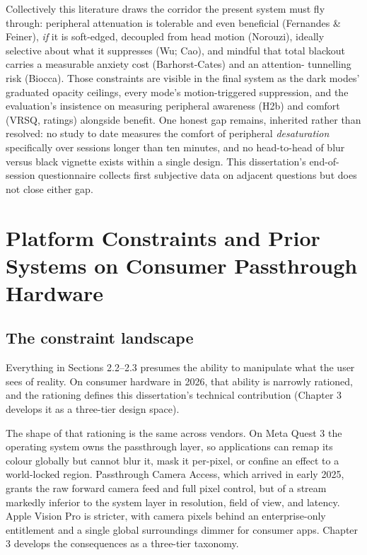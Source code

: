 Collectively this literature draws the corridor the present system must fly through: peripheral
attenuation is tolerable and even beneficial (Fernandes \& Feiner), \textit{if} it is soft-edged,
decoupled from head motion (Norouzi), ideally selective about what it suppresses (Wu; Cao), and
mindful that total blackout carries a measurable anxiety cost (Barhorst-Cates) and an attention-
tunnelling risk (Biocca). Those constraints are visible in the final system as the dark modes'
graduated opacity ceilings, every mode's motion-triggered suppression, and the evaluation's insistence
on measuring peripheral awareness (H2b) and comfort (VRSQ, ratings) alongside benefit. One honest
gap remains, inherited rather than resolved: no study to date measures the comfort of peripheral
\textit{desaturation} specifically over sessions longer than ten minutes, and no head-to-head of blur
versus black vignette exists within a single design. This dissertation's end-of-session questionnaire collects
first subjective data on adjacent questions but does not close either gap.

\section{Platform Constraints and Prior Systems on Consumer Passthrough Hardware}

\subsection{The constraint landscape}

Everything in Sections 2.2–2.3 presumes the ability to manipulate what the user sees of reality. On
consumer hardware in 2026, that ability is narrowly rationed, and the rationing defines this
dissertation's technical contribution (Chapter 3 develops it as a three-tier design space).

The shape of that rationing is the same across vendors. On Meta Quest 3 the operating system owns the
passthrough layer, so applications can remap its colour globally but cannot blur it, mask it
per-pixel, or confine an effect to a world-locked region. Passthrough Camera Access, which arrived in
early 2025, grants the raw forward camera feed and full pixel control, but of a stream markedly
inferior to the system layer in resolution, field of view, and latency. Apple Vision Pro is stricter,
with camera pixels behind an enterprise-only entitlement and a single global surroundings dimmer for
consumer apps. Chapter 3 develops the consequences as a three-tier taxonomy.

